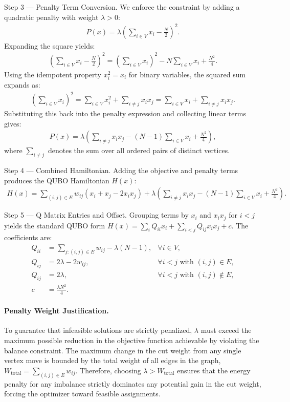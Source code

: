 \documentclass[12pt]{article}
\begin{document}
Step 3 --- Penalty Term Conversion. We enforce the constraint by adding a quadratic penalty with weight $\lambda > 0$:
\begin{align}
P(x) = \lambda \left( \sum_{i \in V} x_i - \frac{N}{2} \right)^2.
\end{align}
Expanding the square yields:
\begin{align}
\left( \sum_{i \in V} x_i - \frac{N}{2} \right)^2 = \left( \sum_{i \in V} x_i \right)^2 - N \sum_{i \in V} x_i + \frac{N^2}{4}.
\end{align}
Using the idempotent property $x_i^2 = x_i$ for binary variables, the squared sum expands as:
\begin{align}
\left( \sum_{i \in V} x_i \right)^2 = \sum_{i \in V} x_i^2 + \sum_{i \neq j} x_i x_j = \sum_{i \in V} x_i + \sum_{i \neq j} x_i x_j.
\end{align}
Substituting this back into the penalty expression and collecting linear terms gives:
\begin{align}
P(x) = \lambda \left( \sum_{i \neq j} x_i x_j - (N-1) \sum_{i \in V} x_i + \frac{N^2}{4} \right),
\end{align}
where $\sum_{i \neq j}$ denotes the sum over all ordered pairs of distinct vertices.

Step 4 --- Combined Hamiltonian. Adding the objective and penalty terms produces the QUBO Hamiltonian $H(x)$:
\begin{align}
H(x) = \sum_{(i,j) \in E} w_{ij} (x_i + x_j - 2x_i x_j) + \lambda \left( \sum_{i \neq j} x_i x_j - (N-1) \sum_{i \in V} x_i + \frac{N^2}{4} \right).
\end{align}

Step 5 --- Q Matrix Entries and Offset. Grouping terms by $x_i$ and $x_i x_j$ for $i < j$ yields the standard QUBO form $H(x) = \sum_{i} Q_{ii} x_i + \sum_{i < j} Q_{ij} x_i x_j + c$. The coefficients are:
\begin{align}
Q_{ii} &= \sum_{j : (i,j) \in E} w_{ij} - \lambda(N-1), & \forall i \in V, \\
Q_{ij} &= 2\lambda - 2w_{ij}, & \forall i < j \text{ with } (i,j) \in E, \\
Q_{ij} &= 2\lambda, & \forall i < j \text{ with } (i,j) \notin E, \\
c &= \frac{\lambda N^2}{4}. &
\end{align}

\paragraph{Penalty Weight Justification.}
To guarantee that infeasible solutions are strictly penalized, $\lambda$ must exceed the maximum possible reduction in the objective function achievable by violating the balance constraint. The maximum change in the cut weight from any single vertex move is bounded by the total weight of all edges in the graph, $W_{\text{total}} = \sum_{(i,j) \in E} w_{ij}$. Therefore, choosing $\lambda > W_{\text{total}}$ ensures that the energy penalty for any imbalance strictly dominates any potential gain in the cut weight, forcing the optimizer toward feasible assignments.
\end{document}

